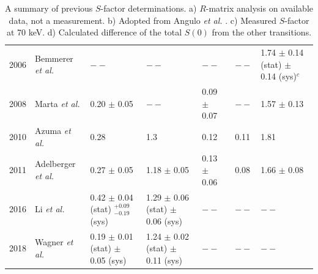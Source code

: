 \begin{table}
\begin{tabular}{@{}lllllll@{}}
2006 & Bemmerer \textit{et al.} \cite{Bemmerer2006}              & $--$                                            & $--$                                    & $--$                           & $--$         & 1.74 $\pm$ 0.14 (stat) $\pm$ 0.14 (sys)$^{c}$ \\
2008 & Marta \textit{et al.} \cite{Marta2008}                    & 0.20 $\pm$ 0.05                                 & $--$                                    & 0.09 $\pm$ 0.07                & $--$         & 1.57 $\pm$ 0.13                               \\
2010 & Azuma \textit{et al.} \cite{Azuma2010}                    & 0.28                                            & 1.3                                     & 0.12                           & 0.11         & 1.81                                          \\
2011 & Adelberger \textit{et al.} \cite{Adelberger2011}          & 0.27 $\pm$ 0.05                                 & 1.18 $\pm$ 0.05                         & 0.13 $\pm$ 0.06                & 0.08         & 1.66 $\pm$ 0.08                               \\
2016 & Li \textit{et al.} \cite{Li2016}                          & 0.42 $\pm$ 0.04 (stat)  $^{+0.09}_{-0.19}$(sys) & 1.29 $\pm$ 0.06 (stat) $\pm$ 0.06 (sys) & $--$                           & $--$         & $--$                                          \\
2018 & Wagner \textit{et al.} \cite{Wagner2018}                  & 0.19 $\pm$ 0.01 (stat) $\pm$ 0.05 (sys)         & 1.24 $\pm$ 0.02 (stat) $\pm$ 0.11 (sys) & $--$                           & $--$         & $--$                                          \\ \bottomrule
\end{tabular}
\label{table: s factors}
\caption{A summary of previous $S$-factor determinations. a) $R$-matrix analysis on available data, not a measurement. b) Adopted from Angulo \textit{et al.} \cite{Angulo2001}. c) Measured $S$-factor at 70 keV. d) Calculated difference of the total $S(0)$ from the other transitions.}
\end{table}

